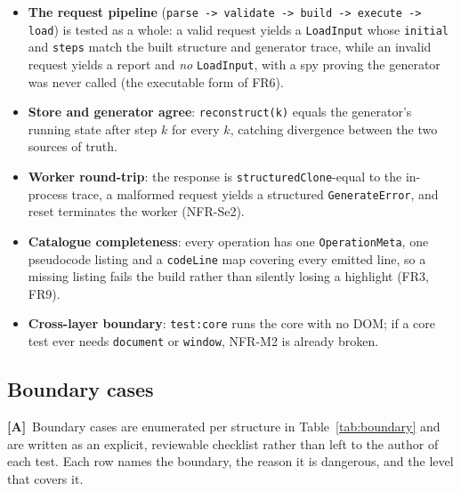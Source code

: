 \documentclass[11pt,a4paper]{article}
\newcommand{\A}{\textcolor{asmc}{\textbf{[A]}}}     %
\newcommand{\ct}[1]{\texttt{#1}}
\begin{document}
\begin{itemize}[leftmargin=1.4em,topsep=2pt,itemsep=1pt]
  \item \textbf{The request pipeline} (\ct{parse -> validate -> build -> execute -> load}) is
        tested as a whole: a valid request yields a \ct{LoadInput} whose \ct{initial} and
        \ct{steps} match the built structure and generator trace, while an invalid request
        yields a report and \emph{no} \ct{LoadInput}, with a spy proving the generator was never
        called (the executable form of FR6).
  \item \textbf{Store and generator agree}: \ct{reconstruct(k)} equals the generator's running
        state after step $k$ for every $k$, catching divergence between the two sources of
        truth.
  \item \textbf{Worker round-trip}: the response is \ct{structuredClone}-equal to the
        in-process trace, a malformed request yields a structured \ct{GenerateError}, and reset
        terminates the worker (NFR-Se2).
  \item \textbf{Catalogue completeness}: every operation has one \ct{OperationMeta}, one
        pseudocode listing and a \ct{codeLine} map covering every emitted line, so a missing
        listing fails the build rather than silently losing a highlight (FR3, FR9).
  \item \textbf{Cross-layer boundary}: \ct{test:core} runs the core with no DOM; if a core test
        ever needs \ct{document} or \ct{window}, NFR-M2 is already broken.
\end{itemize}

\subsection{Boundary cases}

\A\ Boundary cases are enumerated per structure in Table~\ref{tab:boundary} and are written as
an explicit, reviewable checklist rather than left to the author of each test. Each row names
the boundary, the reason it is dangerous, and the level that covers it.
\end{document}
